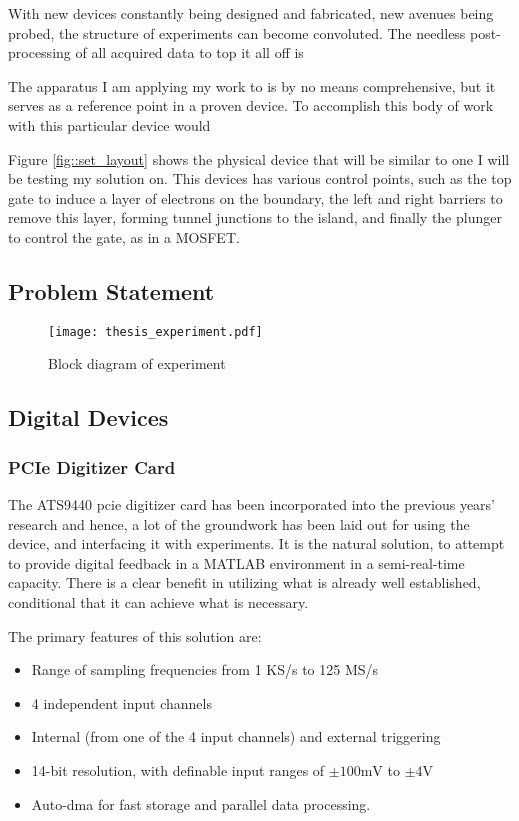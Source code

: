 With new devices constantly being designed and fabricated, new avenues being probed, the structure of experiments can become convoluted. The needless post-processing of all acquired data to top it all off is 


The apparatus I am applying my work to is by no means comprehensive, but it serves as a reference point in a proven device. To accomplish this body of work with this particular device would 


Figure \ref{fig::set_layout} \cite{morello2010single}
shows the physical device that will be similar to one I will be testing my solution on. This devices has various control points, such as the top gate to induce a layer of electrons on the boundary, the left and right barriers to remove this layer, forming tunnel junctions to the island, and finally the plunger to control the gate, as in a MOSFET.
\subsection{Problem Statement}

\begin{figure}[htbp!]
	\centering
	\texttt{[image: thesis\_experiment.pdf]}
	\caption{Block diagram of experiment}
	\label{fig::thesis_experiment}
\end{figure}

\subsection{Digital Devices}
\subsubsection{PCIe Digitizer Card}
The ATS9440 \gls{pcie} digitizer card \cite{ATS9440} has been incorporated into the previous years' research and hence, a lot of the groundwork has been laid out for using the device, and interfacing it with experiments. It is the natural solution, to attempt to provide digital feedback in a MATLAB environment in a semi-real-time capacity. There is a clear benefit in utilizing what is already well established, conditional that it can achieve what is necessary.

The primary features of this solution are:
\begin{itemize}
	\item Range of sampling frequencies from 1 KS/s to 125 MS/s
	\item 4 independent input channels
	\item Internal (from one of the 4 input channels) and external triggering
	\item 14-bit resolution, with definable input ranges of $\pm 100 \textrm{mV}$ to $\pm 4 \textrm{V}$
	\item Auto-\gls{dma} for fast storage and parallel data processing.
\end{itemize}

